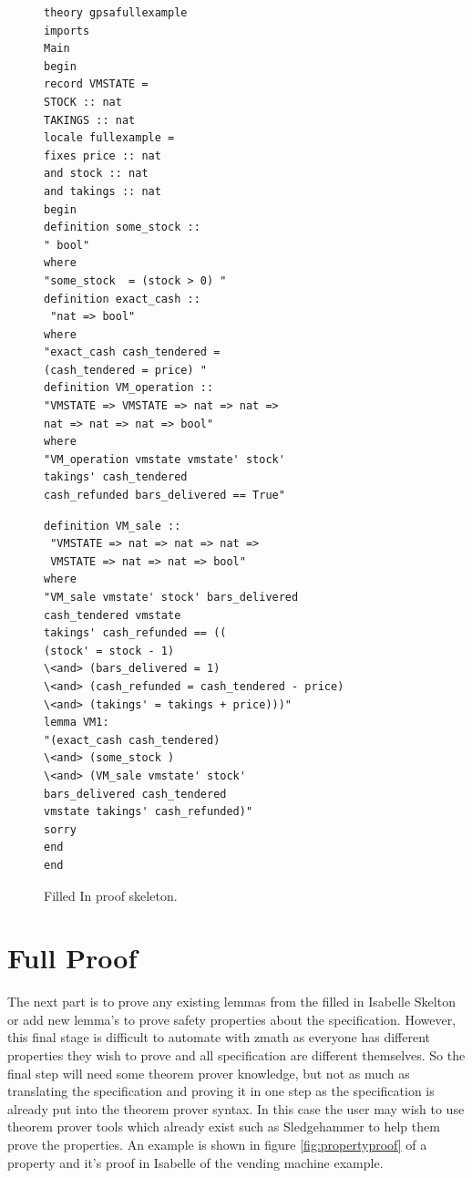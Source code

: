 \begin{figure}[H]
\centering
\begin{minipage}{0.45\textwidth}
\centering
\begin{scriptsize}
\begin{BVerbatim}
theory gpsafullexample
imports 
Main 
begin 
record VMSTATE = 
STOCK :: nat
TAKINGS :: nat
locale fullexample = 
fixes price :: nat
and stock :: nat
and takings :: nat
begin
definition some_stock :: 
" bool"
where 
"some_stock  = (stock > 0) "
definition exact_cash :: 
 "nat => bool"
where 
"exact_cash cash_tendered = 
(cash_tendered = price) "
definition VM_operation :: 
"VMSTATE => VMSTATE => nat => nat => 
nat => nat => nat => bool"
where 
"VM_operation vmstate vmstate' stock'
takings' cash_tendered 
cash_refunded bars_delivered == True"
\end{BVerbatim}
\end{scriptsize}
\end{minipage}\hfill
\begin{minipage}{0.45\textwidth}
\begin{scriptsize}
\begin{BVerbatim}
definition VM_sale :: 
 "VMSTATE => nat => nat => nat => 
 VMSTATE => nat => nat => bool"
where 
"VM_sale vmstate' stock' bars_delivered
cash_tendered vmstate 
takings' cash_refunded == ((
(stock' = stock - 1) 
\<and> (bars_delivered = 1) 
\<and> (cash_refunded = cash_tendered - price) 
\<and> (takings' = takings + price)))"
lemma VM1: 
"(exact_cash cash_tendered)
\<and> (some_stock )
\<and> (VM_sale vmstate' stock' 
bars_delivered cash_tendered 
vmstate takings' cash_refunded)"
sorry
end
end
\end{BVerbatim}
\end{scriptsize}
\end{minipage}
\caption{Filled In proof skeleton. \label{fig:fillinFullexample}}
\end{figure}

\section{Full Proof}

The next part is to prove any existing lemmas from the filled in Isabelle Skelton or add new lemma's to prove safety properties about the specification. However, this final stage is difficult to automate with \gls{zmath} as everyone has different properties they wish to prove and all specification are different themselves. So the final step will need some theorem prover knowledge, but not as much as translating the specification and proving it in one step as the specification is already put into the theorem prover syntax. In this case the user may wish to use theorem prover tools which already exist such as Sledgehammer \cite{sledgehammer} to help them prove the properties. An example is shown in figure \ref{fig:propertyproof} of a property and it's proof in Isabelle of the vending machine example.

